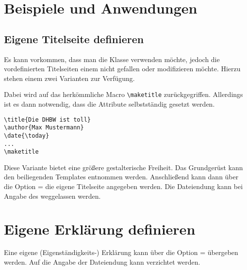 \documentclass[babel=ngerman,highlight=false]{skdoc}
\begin{document}
            \DescribeMacro\getSupervisor
            
            \DescribeMacro\getCourse
            
            \DescribeMacro\getStudentId
            
            \DescribeMacro\getInstitute
            
            \DescribeMacro\getInstituteSection
            
            \DescribeMacro\getProcessingPeriod
            
    \section{Beispiele und Anwendungen}
        \subsection{Eigene Titelseite definieren}
            Es kann vorkommen, dass man die Klasse verwenden möchte, jedoch die vordefinierten Titelseiten einem nicht gefallen oder modifizieren möchte. Hierzu stehen einem zwei Varianten zur Verfügung.
            
            Dabei wird auf das herkömmliche Macro \verb|\maketitle| zurückgegriffen. Allerdings ist es dann notwendig, dass die Attribute selbstständig gesetzt werden.
            \begin{verbatim}
\title{Die DHBW ist toll}
\author{Max Mustermann}
\date{\today}
...
\maketitle
            \end{verbatim}
            
            Diese Variante bietet eine größere gestalterische Freiheit. Das Grundgerüst kann den beiliegenden Templates entnommen werden. Anschließend kann dann über die Option  =  die eigene Titelseite angegeben werden. Die Dateiendung kann bei Angabe des  weggelassen werden.
            
        \section{Eigene Erklärung definieren}
            Eine eigene (Eigenständigkeits-) Erklärung kann über die Option  =  übergeben werden. Auf die Angabe der Dateiendung kann verzichtet werden.
            
\end{document}
